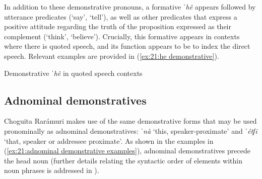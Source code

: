 In addition to these demonstrative pronouns, a formative \textit{ˈhê} appears followed by utterance predicates (`say', `tell'), as well as other predicates that express a positive attitude regarding the truth of the proposition expressed as their complement (`think', `believe'). Crucially, this formative appears in contexts where there is quoted speech, and its function appears to be to index the direct speech. Relevant examples are provided in (\ref{ex:21:he demonstrative}).

\ea\label{ex:21:he demonstrative}
{Demonstrative \textit{ˈhê} in quoted speech contexts}

    \z
\z


\subsection{Adnominal demonstratives}
\label{subsec:21:adnominal demonstratives}

Choguita Rarámuri makes use of the same demonstrative forms that may be used pronominally as adnominal demonstratives: \textit{ˈnà} `this, speaker-proximate' and \textit{ˈétʃi} `that, speaker or addressee proximate'. As shown in the examples in (\ref{ex:21:adnominal demonstrative examples}), adnominal demonstratives precede the head noun (further details relating the syntactic order of elements within noun phrases is addressed in ).

